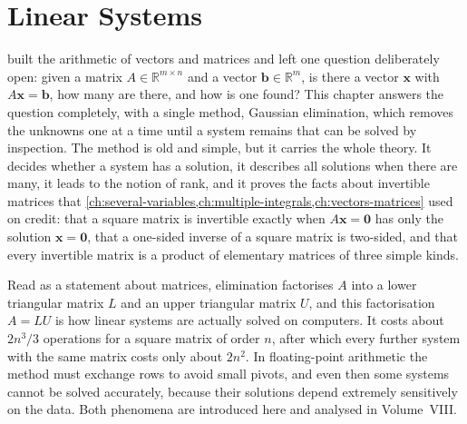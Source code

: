 \chapter{Linear Systems}
\label{ch:linear-systems}


 built the arithmetic of vectors and matrices and left one question deliberately open: given a matrix $A\in\mathbb R^{m\times n}$ and a vector $\mathbf b\in\mathbb R^m$, is there a vector $\mathbf x$ with $A\mathbf x=\mathbf b$, how many are there, and how is one found? This chapter answers the question completely, with a single method, Gaussian elimination, which removes the unknowns one at a time until a system remains that can be solved by inspection. The method is old and simple, but it carries the whole theory. It decides whether a system has a solution, it describes all solutions when there are many, it leads to the notion of rank, and it proves the facts about invertible matrices that \cref{ch:several-variables,ch:multiple-integrals,ch:vectors-matrices} used on credit: that a square matrix is invertible exactly when $A\mathbf x=\mathbf0$ has only the solution $\mathbf x=\mathbf 0$, that a one-sided inverse of a square matrix is two-sided, and that every invertible matrix is a product of elementary matrices of three simple kinds.

Read as a statement about matrices, elimination factorises $A$ into a lower triangular matrix $L$ and an upper triangular matrix $U$, and this factorisation $A=LU$ is how linear systems are actually solved on computers. It costs about $2n^3/3$ operations for a square matrix of order $n$, after which every further system with the same matrix costs only about $2n^2$. In floating-point arithmetic the method must exchange rows to avoid small pivots, and even then some systems cannot be solved accurately, because their solutions depend extremely sensitively on the data. Both phenomena are introduced here and analysed in Volume~VIII.


